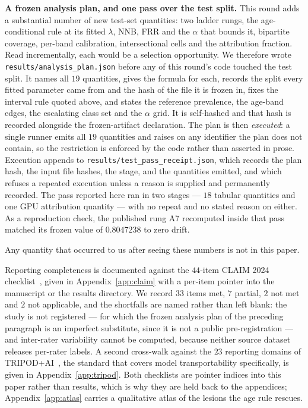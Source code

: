 \documentclass[journal]{IEEEtran}
\begin{document}
\textbf{A frozen analysis plan, and one pass over the test split.} This round adds a
substantial number of new test-set quantities: two ladder rungs, the age-conditional rule at
its fitted $\lambda$, NNB, FRR and the $\alpha$ that bounds it, bipartite coverage,
per-band calibration, intersectional cells and the attribution fraction. Read incrementally,
each would be a selection opportunity. We therefore wrote \texttt{results/analysis\_plan.json}
before any of this round's code touched the test split. It names all $19$ quantities, gives
the formula for each, records the split every fitted parameter came from and the hash of the
file it is frozen in, fixes the interval rule quoted above, and states the reference
prevalence, the age-band edges, the escalating class set and the $\alpha$ grid. It is
self-hashed and that hash is recorded alongside the frozen-artifact declaration. The plan is
then \emph{executed}: a single runner emits all $19$ quantities and raises on any identifier
the plan does not contain, so the restriction is enforced by the code rather than asserted in
prose. Execution appends to \texttt{results/test\_pass\_receipt.json}, which records the plan
hash, the input file hashes, the stage, and the quantities emitted, and which refuses a
repeated execution unless a reason is supplied and permanently recorded. The pass reported
here ran in two stages --- $18$ tabular quantities and one GPU attribution quantity --- with
no repeat and no stated reason on either. As a reproduction check, the published rung A7
recomputed inside that pass matched its frozen value of $0.8047238$ to zero drift.

Any quantity that occurred to us after seeing these numbers is not in this paper.

Reporting completeness is documented against the $44$-item CLAIM 2024
checklist~\cite{tejani2024claim}, given in Appendix~\ref{app:claim} with a per-item pointer
into the manuscript or the results directory. We record $33$ items met, $7$ partial, $2$ not
met and $2$ not applicable, and the shortfalls are named rather than left blank: the study
is not registered --- for which the frozen analysis plan of the preceding paragraph is an
imperfect substitute, since it is not a public pre-registration --- and inter-rater
variability cannot be computed, because neither source dataset releases per-rater labels. A
second cross-walk against the $23$ reporting domains of TRIPOD+AI~\cite{collins2024tripodai},
the standard that covers model transportability specifically, is given in
Appendix~\ref{app:tripod}. Both checklists are pointer indices into this paper rather than
results, which is why they are held back to the appendices; Appendix~\ref{app:atlas} carries a
qualitative atlas of the lesions the age rule rescues.
\end{document}
